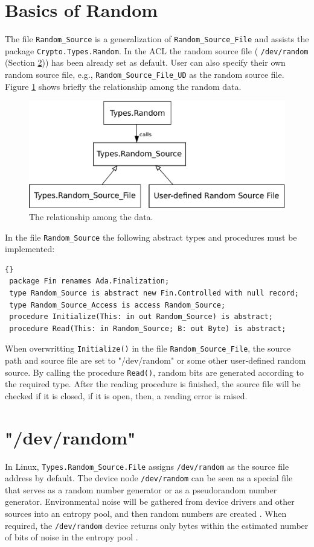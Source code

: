 \section{Basics of Random}\label{BasicRandom}
The file \texttt{Random\_Source} is a generalization of
\texttt{Random\_Source\_File} and assists the package
\texttt{Crypto.Types.Random}. In the ACL the random source file (
\texttt{/dev/random} (Section \ref{DevRandom})) has been already set as
default. User can also specify their own random source file, e.g.,
\texttt{Random\_Source\_File\_UD} as the random source file. Figure
\ref{WorkflowRandom} shows briefly the relationship among the random
data.
\begin{figure}[htp]
  \centering
  \includegraphics[scale=0.6]{./images/Random}
  \caption{The relationship among the data.}\label{WorkflowRandom}
\end{figure}
In the file \texttt{Random\_Source} the following abstract types and
procedures must be implemented:

\begin{lstlisting}{}
 package Fin renames Ada.Finalization;
 type Random_Source is abstract new Fin.Controlled with null record;
 type Random_Source_Access is access Random_Source;
 procedure Initialize(This: in out Random_Source) is abstract;
 procedure Read(This: in Random_Source; B: out Byte) is abstract;
\end{lstlisting}
When overwritting \texttt{Initialize()} in the file
\texttt{Random\_Source\_File}, the source path and source file are set
to "/dev/random" or some other user-defined random source. By calling
the procedure \texttt{Read()}, random bits are generated according to
the required type. After the reading procedure is finished, the source
file will be checked if it is closed, if it is open, then, a reading
error is raised.

\section{"/dev/random"}\label{DevRandom}
In Linux, \texttt{Types.Random\_Source.File} assigns
\texttt{/dev/random} as the source file address by default. The device
node \texttt{/dev/random} can be seen as a special file that serves as
a random number generator or as a pseudorandom number
generator. Environmental noise will be gathered from device drivers
and other sources into an entropy pool, and then random numbers are
created \cite{dev-random}. When required, the \texttt{/dev/random} device
returns only bytes within the estimated number of bits of noise in the
entropy pool \cite{dev-random}.

